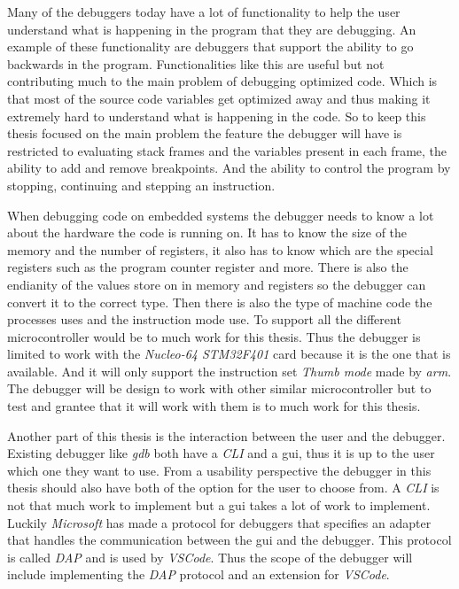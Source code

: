 Many of the debuggers today have a lot of functionality to help the user understand what is happening in the program that they are debugging.
An example of these functionality are debuggers that support the ability to go backwards in the program.
Functionalities like this are useful but not contributing much to the main problem of debugging optimized code.
Which is that most of the source code variables get optimized away and thus making it extremely hard to understand what is happening in the code.
So to keep this thesis focused on the main problem the feature the debugger will have is restricted to evaluating stack frames and the variables present in each frame, the ability to add and remove breakpoints.
And the ability to control the program by stopping, continuing and stepping an instruction.


When debugging code on embedded systems the debugger needs to know a lot about the hardware the code is running on.
It has to know the size of the memory and the number of registers, it also has to know which are the special registers such as the program counter register and more.
There is also the endianity of the values store on in memory and registers so the debugger can convert it to the correct type.
Then there is also the type of machine code the processes uses and the instruction mode use.
To support all the different microcontroller would be to much work for this thesis.
Thus the debugger is limited to work with the \emph{Nucleo-64 STM32F401} card because it is the one that is available.
And it will only support the instruction set \emph{Thumb mode} made by \emph{arm}.
The debugger will be design to work with other similar microcontroller but to test and grantee that it will work with them is to much work for this thesis.


Another part of this thesis is the interaction between the user and the debugger.
Existing debugger like \emph{gdb} both have a \emph{CLI} and a \acrfull{gui}, thus it is up to the user which one they want to use.
From a usability perspective the debugger in this thesis should also have both of the option for the user to choose from.
A \emph{CLI} is not that much work to implement but a \acrshort{gui} takes a lot of work to implement.
Luckily \emph{Microsoft} has made a protocol for debuggers that specifies an adapter that handles the communication between the \acrshort{gui} and the debugger.
This protocol is called \emph{DAP} and is used by \emph{VSCode}.
Thus the scope of the debugger will include implementing the \emph{DAP} protocol and an extension for \emph{VSCode}.


